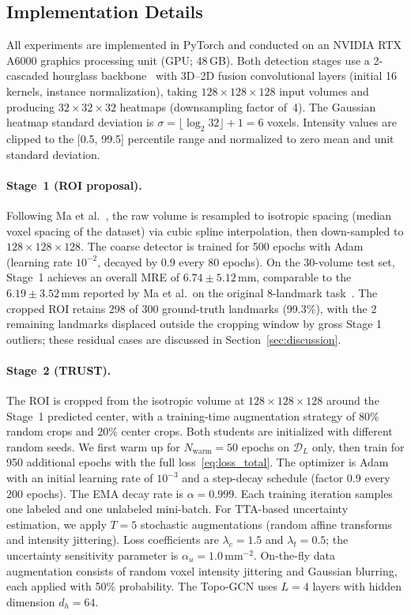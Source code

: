 \documentclass[conference]{IEEEtran}
\begin{document}
\subsection{Implementation Details}
\label{sec:implementation}

All experiments are implemented in PyTorch and conducted on an NVIDIA RTX A6000 graphics processing unit (GPU; 48\,GB). Both detection stages use a 2-cascaded hourglass backbone~\cite{Newell2016_stacked_hourglass} with 3D--2D fusion convolutional layers (initial 16 kernels, instance normalization), taking $128 \times 128 \times 128$ input volumes and producing $32 \times 32 \times 32$ heatmaps (downsampling factor of~4). The Gaussian heatmap standard deviation is $\sigma = \lfloor\log_2 32\rfloor + 1 = 6$ voxels. Intensity values are clipped to the [0.5, 99.5] percentile range and normalized to zero mean and unit standard deviation.

\paragraph{Stage~1 (ROI proposal).}
Following Ma et al.~\cite{Ma2023_aortic_landmarks}, the raw volume is resampled to isotropic spacing (median voxel spacing of the dataset) via cubic spline interpolation, then down-sampled to $128 \times 128 \times 128$. The coarse detector is trained for 500 epochs with Adam (learning rate $10^{-2}$, decayed by 0.9 every 80 epochs). On the 30-volume test set, Stage~1 achieves an overall MRE of $6.74 \pm 5.12$\,mm, comparable to the $6.19 \pm 3.52$\,mm reported by Ma et al.\ on the original 8-landmark task~\cite{Ma2023_aortic_landmarks}. The cropped ROI retains 298 of 300 ground-truth landmarks (99.3\%), with the 2 remaining landmarks displaced outside the cropping window by gross Stage 1 outliers; these residual cases are discussed in Section~\ref{sec:discussion}.

\paragraph{Stage~2 (TRUST).}
The ROI is cropped from the isotropic volume at $128 \times 128 \times 128$ around the Stage~1 predicted center, with a training-time augmentation strategy of 80\% random crops and 20\% center crops. Both students are initialized with different random seeds. We first warm up for $N_{\mathrm{warm}} = 50$ epochs on $\mathcal{D}_L$ only, then train for 950 additional epochs with the full loss~\eqref{eq:loss_total}. The optimizer is Adam with an initial learning rate of $10^{-3}$ and a step-decay schedule (factor 0.9 every 200 epochs). The EMA decay rate is $\alpha = 0.999$. Each training iteration samples one labeled and one unlabeled mini-batch. For TTA-based uncertainty estimation, we apply $T = 5$ stochastic augmentations (random affine transforms and intensity jittering). Loss coefficients are $\lambda_c = 1.5$ and $\lambda_t = 0.5$; the uncertainty sensitivity parameter is $\alpha_u = 1.0$\,mm$^{-2}$. On-the-fly data augmentation consists of random voxel intensity jittering and Gaussian blurring, each applied with 50\% probability. The Topo-GCN uses $L = 4$ layers with hidden dimension $d_h = 64$.
\end{document}

